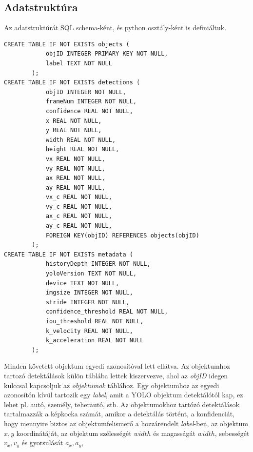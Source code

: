 \documentclass[acmtog, authorversion]{acmart}
\begin{document}
\subsection{Adatstruktúra}
Az adatstruktúrát SQL schema-ként, és python osztály-ként is definiáltuk.
\begin{verbatim}
CREATE TABLE IF NOT EXISTS objects (
            objID INTEGER PRIMARY KEY NOT NULL,
            label TEXT NOT NULL
        );
CREATE TABLE IF NOT EXISTS detections (
            objID INTEGER NOT NULL,
            frameNum INTEGER NOT NULL,
            confidence REAL NOT NULL,
            x REAL NOT NULL,
            y REAL NOT NULL,
            width REAL NOT NULL,
            height REAL NOT NULL,
            vx REAL NOT NULL,
            vy REAL NOT NULL,
            ax REAL NOT NULL,
            ay REAL NOT NULL,
            vx_c REAL NOT NULL,
            vy_c REAL NOT NULL,
            ax_c REAL NOT NULL,
            ay_c REAL NOT NULL,
            FOREIGN KEY(objID) REFERENCES objects(objID)
        );
CREATE TABLE IF NOT EXISTS metadata (
            historyDepth INTEGER NOT NULL,
            yoloVersion TEXT NOT NULL,   
            device TEXT NOT NULL,
            imgsize INTEGER NOT NULL,
            stride INTEGER NOT NULL,
            confidence_threshold REAL NOT NULL,
            iou_threshold REAL NOT NULL,
            k_velocity REAL NOT NULL,
            k_acceleration REAL NOT NULL
        );
\end{verbatim}
Minden követett objektum egyedi azonosítóval lett ellátva. Az objektumhoz tartozó detektálások külön táblába lettek kiszervezve,
ahol az \textit{objID} idegen kulccsal kapcsoljuk az \textit{objektumok} táblához. Egy objektumhoz az egyedi azonosítón kívül
tartozik egy \textit{label}, amit a YOLO objektum detektálótól kap, ez lehet pl. autó, személy, teherautó, stb. Az objektumokhoz
tartózó detektálások tartalmazzák a képkocka számát, amikor a detektálás történt, a konfidenciát, hogy mennyire biztos az
objektumfelismerő a hozzárendelt \textit{label}-ben, az objektum \begin{math}x,y\end{math} koordinátáját, az objektum szélességét
\begin{math}width\end{math} és magasságát \begin{math}width\end{math}, sebességét \begin{math}v_x,v_y\end{math} és gyorsulását \begin{math}a_x,a_y\end{math}, 
\end{document}

